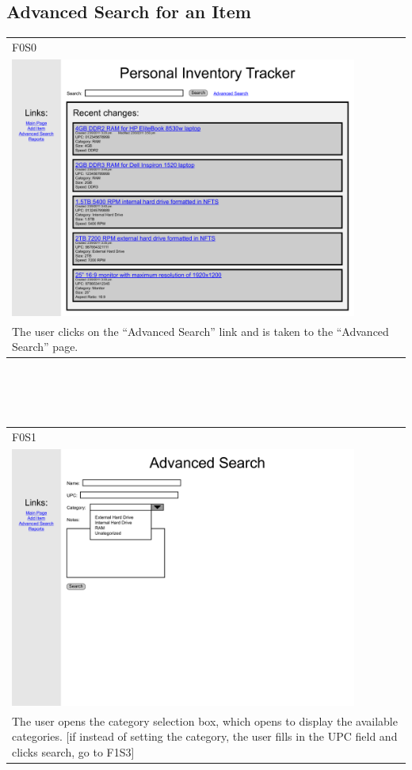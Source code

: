\documentclass{article}
\begin{document}
\subsection{Advanced Search for an Item}
\begin{tabular}{ p{4.5in} }
F0S0\\
\includegraphics[keepaspectratio, width=4.5in]{advancedSearchF0S0.pdf} \\
The user clicks on the ``Advanced Search'' link and is taken to the ``Advanced Search'' page.
\end{tabular}\\
~\\
~\\
\begin{tabular}{ p{4.5in} }
F0S1\\
\includegraphics[keepaspectratio, width=4.5in]{advancedSearchF0S1.pdf} \\
The user opens the category selection box, which opens to display the available categories. [if instead of setting the category, the user fills in the UPC field and clicks search, go to F1S3]
\end{tabular}\\
\end{document}
